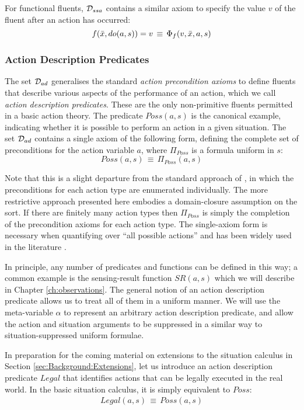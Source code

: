 For functional fluents, $\mathcal{D}_{ssa}$ contains a similar axiom to specify
the value $v$ of the fluent after an action has occurred:\[
f(\bar{x},do(a,s))=v\,\equiv\,\Phi_{f}(v,\bar{x},a,s)\]



\subsubsection{Action Description Predicates}

The set $\mathcal{D}_{ad}$ generalises the standard \emph{action precondition
axioms} \citep{pirri99contributions_sitcalc} to define fluents that
describe various aspects of the performance of an action, which we
call \emph{action description predicates}. These are the only non-primitive
fluents permitted in a basic action theory. The predicate $Poss(a,s)$
is the canonical example, indicating whether it is possible to perform
an action in a given situation. The set $\mathcal{D}_{ad}$ contains a single
axiom of the following form, defining the complete set of preconditions
for the action variable $a$, where $\Pi_{Poss}$ is a formula uniform
in $s$:\[
Poss(a,s)\,\equiv\,\Pi_{Poss}(a,s)\]


Note that this is a slight departure from the standard approach of
\citep{pirri99contributions_sitcalc}, in which the preconditions
for each action type are enumerated individually. The more restrictive
approach presented here embodies a domain-closure assumption on the
 sort. If there are finitely many action types then $\Pi_{Poss}$
is simply the completion of the precondition axioms for each action
type. The single-axiom form is necessary when quantifying over {}``all
possible actions'' and has been widely used in the literature \citep{vassos08progression_future_queries,savelli06sc_quantum_levels}.

In principle, any number of predicates and functions can be defined
in this way; a common example is the sensing-result function $SR(a,s)$
which we will describe in Chapter \ref{ch:observations}. The general
notion of an action description predicate allows us to treat all of
them in a uniform manner. We will use the meta-variable $\alpha$
to represent an arbitrary action description predicate, and allow
the action and situation arguments to be suppressed in a similar way
to situation-suppressed uniform formulae.

In preparation for the coming material on extensions to the situation
calculus in Section \ref{sec:Background:Extensions}, let us introduce
an action description predicate $Legal$ that identifies actions that
can be legally executed in the real world. In the basic situation
calculus, it is simply equivalent to $Poss$:\begin{gather*}
Legal(a,s)\,\equiv\, Poss(a,s)\end{gather*}



